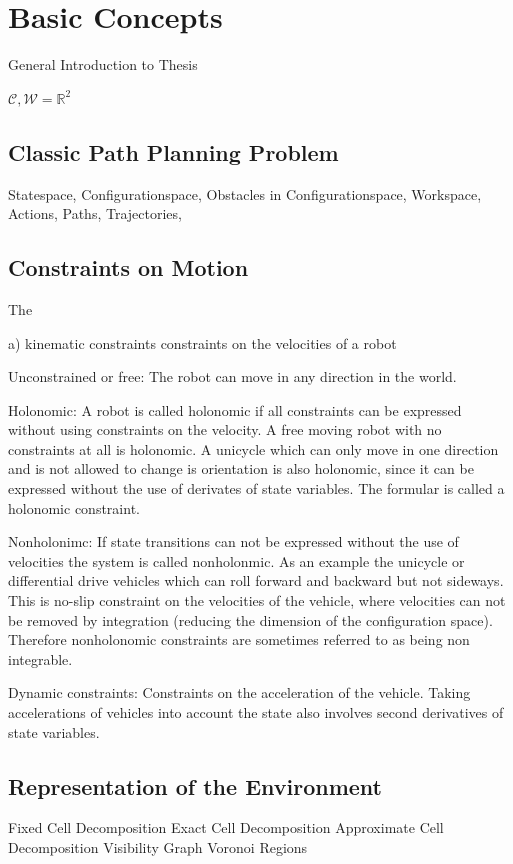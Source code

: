 \chapter{Basic Concepts}\label{ch:introductionplanning}
General Introduction to Thesis

$\mathcal{C,W} = \mathbb{R}^2$

\section{Classic Path Planning Problem}\label{sec:basic}
Statespace,
Configurationspace,
Obstacles in Configurationspace,
Workspace,
Actions,
Paths,
Trajectories,

\section{Constraints on Motion}\label{sec:model}
The 

a) kinematic constraints
constraints on the velocities of a robot

Unconstrained or free:
The robot can move in any direction in the world. 

Holonomic:
A robot is called holonomic if all constraints can be expressed without using constraints on the velocity. 
A free moving robot with no constraints at all is holonomic.
A unicycle which can only move in one direction and is not allowed to change is orientation is also holonomic, since  it can be expressed without the use of derivates of state variables.
The formular is called a holonomic constraint.

Nonholonimc:
If state transitions can not be expressed without the use of velocities the system is called nonholonmic.
As an example the unicycle or differential drive vehicles which can roll forward and backward but not sideways. 
This is no-slip constraint on the velocities of the vehicle, where velocities can not be removed by integration (reducing the dimension of the configuration space).
Therefore nonholonomic constraints are sometimes referred to as being non integrable.


Dynamic constraints:
Constraints on the acceleration of the vehicle.
Taking accelerations of vehicles into account the state also involves second derivatives of state variables.


\section{Representation of the Environment}\label{sec:representation}
Fixed Cell Decomposition
Exact Cell Decomposition
Approximate Cell Decomposition
Visibility Graph
Voronoi Regions

